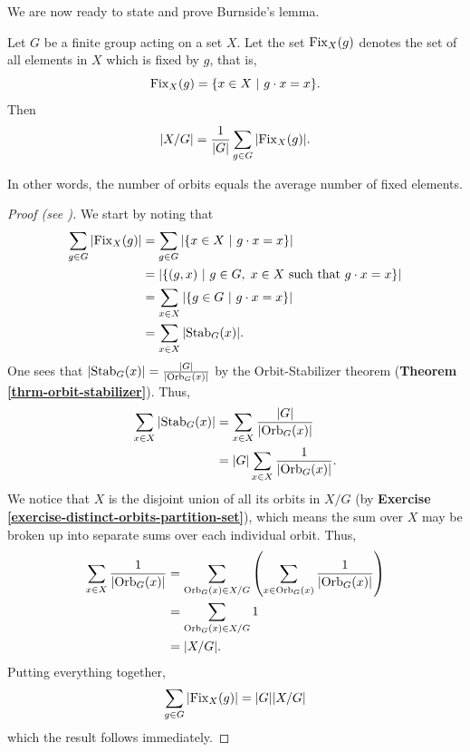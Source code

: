We are now ready to state and prove Burnside's lemma.
\begin{lemma}[Burnside]\label{lemma-burnside}
    Let $G$ be a finite group acting on a set $X$. Let the set $\mathrm{Fix}_{X}(g)$ denotes the set of all elements in $X$ which is fixed by $g$, that is,
    \[
        \Fix{X}{g} = \{x \in X \ | \ g\cdot x = x\}.
    \]
    Then
    \[
        |X/G| = \frac{1}{|G|}\sum_{g\in G} |\mathrm{Fix}_{X}(g)|.
    \]
\end{lemma}
In other words, the number of orbits equals the average number of fixed elements.
\begin{proof}[Proof (see \cite{proofwiki_burnsideslemma})]
    We start by noting that
    \begin{align*}
        \sum_{g\in G} |\Fix{X}{g}| &= \sum_{g\in G} |\{x \in X \ | \ g\cdot x = x\}|\\
        &= |\{(g, x) \ | \ g \in G,\; x \in X \text{ such that } g\cdot x = x\}|\\
        &= \sum_{x\in X} |\{g \in G \ | \ g\cdot x = x\}|\\
        &= \sum_{x\in X} |\Stab{G}{x}|.
    \end{align*}
    One sees that $|\mathrm{Stab}_{G}(x)| = \frac{|G|}{|\mathrm{Orb}_{G}(x)|}$ by the Orbit-Stabilizer theorem (\textbf{Theorem \ref{thrm-orbit-stabilizer}}). Thus,
    \begin{align*}
        \sum_{x\in X} |\mathrm{Stab}_{G}(x)| &= \sum_{x\in X} \frac{|G|}{|\mathrm{Orb}_{G}(x)|}\\
        &= |G|\sum_{x\in X} \frac{1}{|\mathrm{Orb}_{G}(x)|}.
    \end{align*}
    We notice that $X$ is the disjoint union of all its orbits in $X/G$ (by \textbf{Exercise \ref{exercise-distinct-orbits-partition-set}}), which means the sum over $X$ may be broken up into separate sums over each individual orbit. Thus,
    \begin{align*}
        \sum_{x\in X} \frac{1}{|\mathrm{Orb}_{G}(x)|} &= \sum_{\mathrm{Orb}_{G}(x) \in X/G}\left(\sum_{x \in \mathrm{Orb}_{G}(x)} \frac{1}{|\mathrm{Orb}_{G}(x)|}\right)\\
        &= \sum_{\mathrm{Orb}_{G}(x) \in X/G} 1\\
        &= |X/G|.
    \end{align*}
    Putting everything together,
    \[
        \sum_{g\in G} |\mathrm{Fix}_{X}(g)| = |G||X/G|
    \]
    which the result follows immediately.
\end{proof}

\newpage

